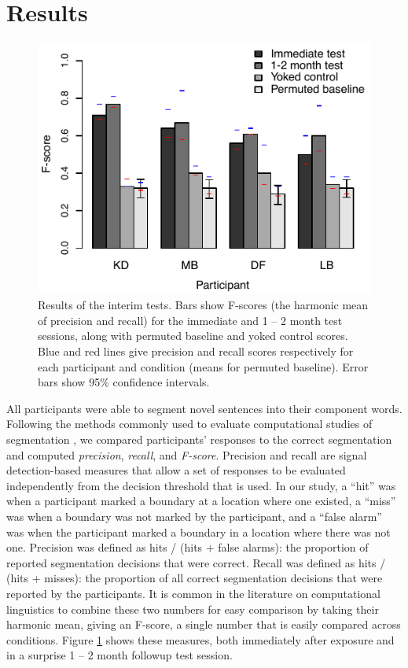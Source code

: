 \documentclass[10pt]{article}
\begin{document}
\section*{Results}


\begin{figure}[t]
\begin{center}
\includegraphics{interim_test_col.pdf}
\caption{\label{fig:interim} Results of the interim tests. Bars show F-scores (the harmonic mean of precision and recall) for the immediate and 1 -- 2 month test sessions, along with permuted baseline and yoked control scores. Blue and red lines give precision and recall scores respectively for each participant and condition (means for permuted baseline). Error bars show 95\% confidence intervals.}
\end{center}
\end{figure}

All participants were able to segment novel sentences into their component words.  Following the methods commonly used to evaluate computational studies of segmentation \cite{brent1999b,goldwater2009}, we compared participants' responses to the correct segmentation and computed {\it precision}, {\it recall}, and {\it F-score}. Precision and recall are signal detection-based measures that allow a set of responses to be evaluated independently from the decision threshold that is used. In our study, a ``hit'' was when a participant marked a boundary at a location where one existed, a ``miss'' was when a boundary was not marked by the participant, and a ``false alarm'' was when the participant marked a boundary in a location where there was not one. Precision was defined as hits / (hits + false alarms): the proportion of reported segmentation decisions that were correct. Recall was defined as hits / (hits + misses): the proportion of all correct segmentation decisions that were reported by the participants. It is common in the literature on computational linguistics to combine these two numbers for easy comparison by taking their harmonic mean, giving an F-score, a single number that is easily compared across conditions. Figure \ref{fig:interim} shows these measures, both immediately after exposure and in a surprise 1 -- 2 month followup test session. 
\end{document}
